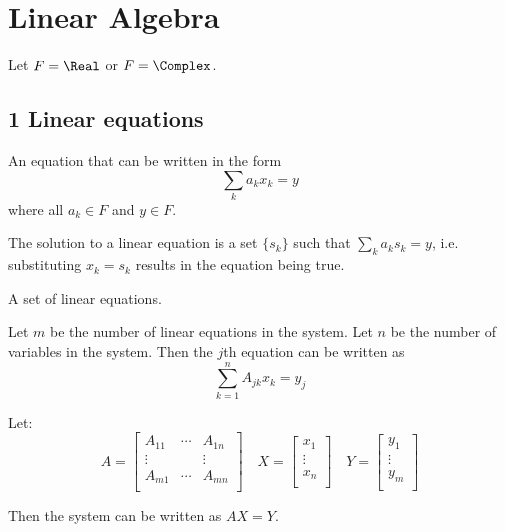 \chapter{Linear Algebra}

Let $F = \Real$ or $F = \Complex$.

\section*{1 Linear equations}

\begin{definition}
  An equation that can be written in the form
  \[
      \sum_k a_k x_k = y
  \]
  where all $a_k \in F$ and $y \in F$.
\end{definition}

\begin{definition}
  The solution to a linear equation is a set $\{ s_k \}$ such that $\sum_k a_k s_k = y$, i.e. substituting $x_k = s_k$ results in the equation being true.
\end{definition}

\begin{definition}
  A set of linear equations.

  Let $m$ be the number of linear equations in the system. Let $n$ be the number of variables in the system. Then the $j$th equation can be written as
  \[
    \sum_{k = 1}^n A_{jk} x_k = y_j
  \]

  Let:
  \[
    A = \begin{bmatrix}
      A_{11} & \cdots & A_{1n} \\
      \vdots &        & \vdots \\
      A_{m1} & \cdots & A_{mn} \\
    \end{bmatrix}
    \quad
    X = \begin{bmatrix}
      x_1 \\
      \vdots \\
      x_n \\
    \end{bmatrix}
    \quad
    Y = \begin{bmatrix}
      y_1 \\
      \vdots \\
      y_m \\
    \end{bmatrix}
  \]

  Then the system can be written as $AX = Y$.
\end{definition}

